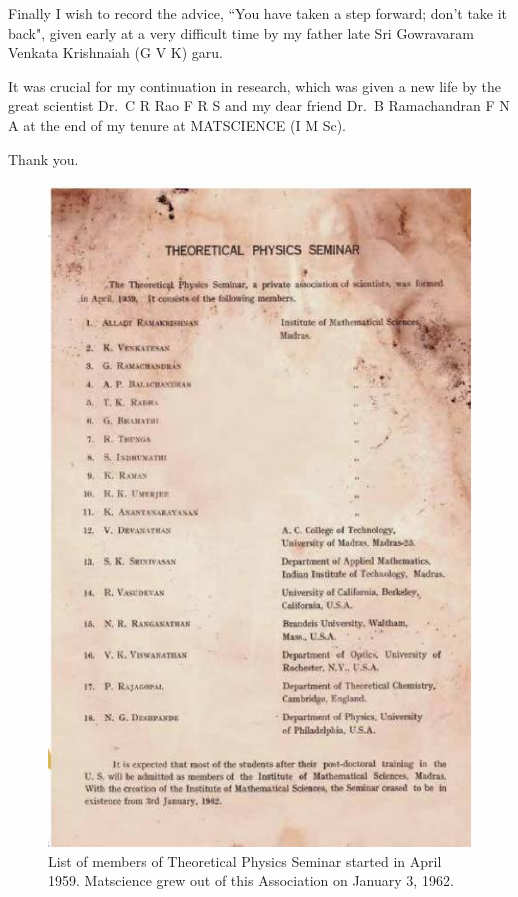 Finally I wish to record the advice, ``You have taken a step forward; don’t take it
back", given early at a very difficult time by my father late Sri Gowravaram Venkata
Krishnaiah (G V K) garu.

It was crucial for my continuation in research, which was given a new life by the
great scientist Dr.\ C R Rao F R S and my dear friend Dr.\ B Ramachandran F N A at
the end of my tenure at MATSCIENCE (I M Sc).

\hfill
Thank you.

\begin{figure}[H]
\centering
\includegraphics[scale=0.65]{src/images/chap25/1.eps}
\caption{List of members of Theoretical Physics Seminar started in April 1959. Matscience grew out of
this Association on January 3, 1962.}
\end{figure}

